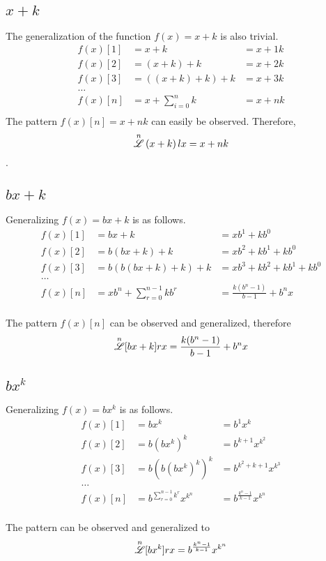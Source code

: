 \documentclass[12pt, letterpaper]{article}
\begin{document}
\subsection{$x+k$}
The generalization of the function $f(x) = x+k$ is also trivial.
\begin{align*}
    f(x)[1] &= x + k             &= x + 1k \\
    f(x)[2] &= (x + k) + k       &= x + 2k \\
    f(x)[3] &= ((x + k) + k) + k &= x + 3k \\
       \dots \\
    f(x)[n] &= x + \sum_{i=0}^n k  &= x + nk \\
\end{align*}
The pattern $f(x)[n] = x + nk$ can easily be observed. Therefore,
$$\overset{n}{\mathscr{L}} \, (x+k) \, lx = x+nk$$.
\\

\subsection{$bx+k$}
Generalizing {$f(x) = bx+k$} is as follows.
\begin{align*}
    f(x)[1] &= bx + k             &= xb^{1}+kb^{0} \\
    f(x)[2] &= b(bx + k) + k       &= xb^{2}+kb^{1}+kb^{0} \\
    f(x)[3] &= b(b(bx + k) + k) + k &= xb^{3} + kb^{2} + kb^{1} + kb^{0} \\
       \dots \\
    f(x)[n] &= xb^{n}+\sum_{r=0}^{n-1} kb^{r}  &= \frac{k(b^{n}-1)}{b-1}+b^{n}x
\end{align*}
\\
The pattern $f(x)[n]$ can be observed and generalized, therefore
$$\overset{n}{\mathscr{L}} [bx+k] rx = \frac{k(b^{n}-1)}{b-1}+b^{n}x$$

\subsection{$bx^k$}
Generalizing {$f(x) = bx^{k}$} is as follows.
\begin{align*}
    f(x)[1] &= bx^{k}             &= b^{1}x^{k} \\
    f(x)[2] &= b(bx^{k}) ^{k}       &= b^{k+1}x^{k^{2}} \\
    f(x)[3] &= b(b(bx^{k})^{k})^{k} &= b^{k^{2} + k + 1} x^{k^{3}} \\
       \dots \\
    f(x)[n] &= b^{\sum_{r=0}^{n-1} k^{r}} x^{k^{n}}  &= b^{\frac{k^{n}-1}{k-1}}x^{k^{n}}
\end{align*}
\\The pattern can be observed and generalized to
$$\overset{n}{\mathscr{L}} [bx^k] rx = b^{\frac{k^{n}-1}{k-1}}x^{k^{n}}$$
\end{document}
